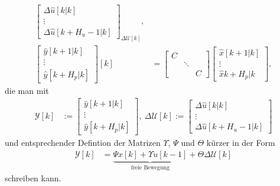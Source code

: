\begin{align*}
{\begin{bmatrix}
\Delta\hat{u}[k|k]\\
\vdots\\
\Delta\hat{u}[k+H_u-1|k]
\end{bmatrix}}_{\Delta\mathcal{U}[k]},\\
\begin{bmatrix}
\hat{y}[k+1|k]\\ \vdots\\ \hat{y}[k+H_p|k]
\end{bmatrix}[k]& = \begin{bmatrix}
C	&			&	\\
	& \ddots	&	\\
	&			& C
\end{bmatrix}\begin{bmatrix}
\hat{x}[k+1|k]\\ \vdots\\ \hat{x}{k+H_p|k}
\end{bmatrix},
\end{align*}
die man mit 
\begin{align*}
	\mathcal{Y}[k] & := \begin{bmatrix}
	\hat{y}[k+1|k]\\
	\vdots\\
	\hat{y}[k+H_p|k]
	\end{bmatrix},\ \Delta\mathcal{U}[k]:=\begin{bmatrix}
	\Delta \hat{u}[k|k]\\
	\vdots\\
	\Delta\hat{u}[k+H_u-1|k]
	\end{bmatrix}
\end{align*}
und entsprechender Defintion der Matrizen $\Upsilon$, $\Psi$ und $\Theta$ kürzer in der Form
\begin{align}
\mathcal{Y}[k] & = \underbrace{\Psi x[k]+\Upsilon u[k-1]}_{\text{freie Bewegung}}+\Theta\Delta\mathcal{U}[k] \label{eqn:kap_4_zustandsraummodell_steuerdiff}
\end{align}
schreiben kann.

